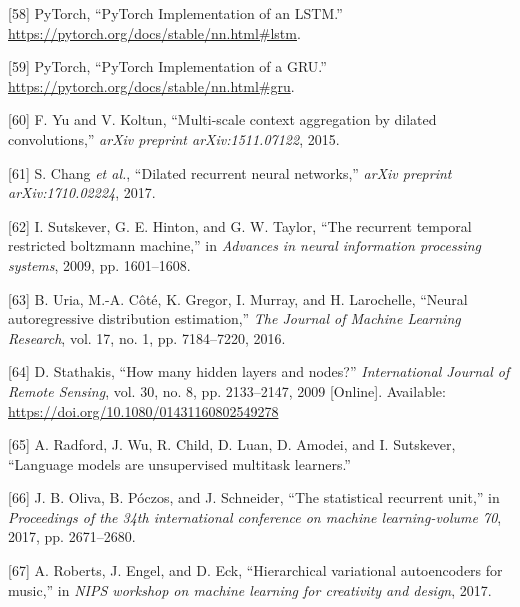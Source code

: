 \documentclass[12pt,]{article}
\begin{document}
\leavevmode\hypertarget{ref-pytorchlstm}{}%
{[}58{]} \relax PyTorch, ``PyTorch Implementation of an LSTM.'' \\
\url{https://pytorch.org/docs/stable/nn.html\#lstm}.

\leavevmode\hypertarget{ref-pytorchgru}{}%
{[}59{]} \relax PyTorch, ``PyTorch Implementation of a GRU.'' \\
\url{https://pytorch.org/docs/stable/nn.html\#gru}.

\leavevmode\hypertarget{ref-yu2015multi}{}%
{[}60{]} F. Yu and V. Koltun, ``Multi-scale context aggregation by
dilated convolutions,'' \emph{arXiv preprint arXiv:1511.07122}, 2015.

\leavevmode\hypertarget{ref-chang2017dilated}{}%
{[}61{]} S. Chang \emph{et al.}, ``Dilated recurrent neural networks,''
\emph{arXiv preprint arXiv:1710.02224}, 2017.

\leavevmode\hypertarget{ref-sutskever2009recurrent}{}%
{[}62{]} I. Sutskever, G. E. Hinton, and G. W. Taylor, ``The recurrent
temporal restricted boltzmann machine,'' in \emph{Advances in neural
information processing systems}, 2009, pp. 1601--1608.

\leavevmode\hypertarget{ref-uria2016neural}{}%
{[}63{]} B. Uria, M.-A. Côté, K. Gregor, I. Murray, and H. Larochelle,
``Neural autoregressive distribution estimation,'' \emph{The Journal of
Machine Learning Research}, vol. 17, no. 1, pp. 7184--7220, 2016.

\leavevmode\hypertarget{ref-doi10108001431160802549278}{}%
{[}64{]} D. Stathakis, ``How many hidden layers and nodes?''
\emph{International Journal of Remote Sensing}, vol. 30, no. 8, pp.
2133--2147, 2009 {[}Online{]}. Available:
\url{https://doi.org/10.1080/01431160802549278}

\leavevmode\hypertarget{ref-radford2018language}{}%
{[}65{]} A. Radford, J. Wu, R. Child, D. Luan, D. Amodei, and I.
Sutskever, ``Language models are unsupervised multitask learners.''

\leavevmode\hypertarget{ref-oliva2017statistical}{}%
{[}66{]} J. B. Oliva, B. Póczos, and J. Schneider, ``The statistical
recurrent unit,'' in \emph{Proceedings of the 34th international
conference on machine learning-volume 70}, 2017, pp. 2671--2680.

\leavevmode\hypertarget{ref-roberts2017hierarchical}{}%
{[}67{]} A. Roberts, J. Engel, and D. Eck, ``Hierarchical variational
autoencoders for music,'' in \emph{NIPS workshop on machine learning for
creativity and design}, 2017.
\end{document}
